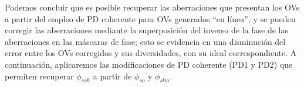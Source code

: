 Podemos concluir que es posible recuperar las aberraciones que presentan los OVs a partir del empleo de PD coherente para OVs generados ``en línea'', y se pueden corregir las aberraciones mediante la superposición del inverso de la fase de las aberraciones en las máscaras de fase; esto se evidencia en una disminución del error entre los OVs corregidos y sus diversidades, con su ideal correspondiente. A continuación, aplicaremos las modificaciones de PD coherente (PD1 y PD2) que permiten recuperar $\phi_{coh}$ a partir de $\phi_{so}$ y $\phi_{slm}$. 


%
%

